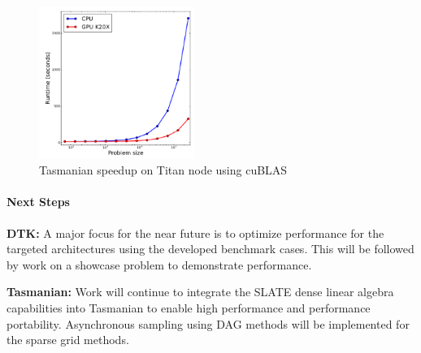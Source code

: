 \begin{figure}[htb]
        \centering
        \includegraphics[width=2in]{projects/2.3.3-MathLibs/2.3.3.11-ALExa/tasmanian-gpu}
        \caption{\label{fig:tasmanian-gpu}Tasmanian speedup on Titan node using cuBLAS}
\end{figure}


\paragraph{Next Steps}

\indent

{\bf DTK:}
A major focus for the near future is to optimize performance
for the targeted architectures using the developed benchmark
cases.
This will be followed by work on a showcase problem to
demonstrate performance.

{\bf Tasmanian:}
Work will continue to integrate the SLATE dense linear
algebra capabilities into Tasmanian to enable high
performance and performance portability.
Asynchronous sampling using DAG methods will be implemented
for the sparse grid methods.


